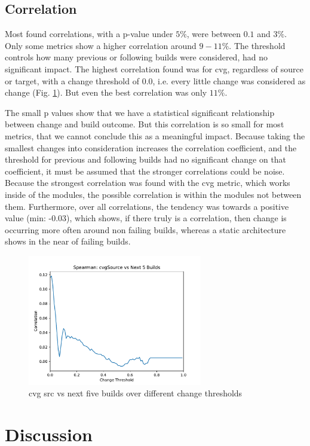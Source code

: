 \documentclass[conference]{IEEEtran}
\begin{document}
\subsection{Correlation}

Most found correlations, with a p-value under $5\%$, were between $0.1$ and $3\%$. Only some metrics show a higher correlation around $9-11\%$. The threshold controls how many previous or following builds were considered, had no significant impact. The highest correlation found was for cvg, regardless of source or target, with a change threshold of $0.0$, i.e. every little change was considered as change (Fig. \ref{cvgPlot}). But even the best correlation was only $11\%$. 

The small p values show that we have a statistical significant relationship between change and build outcome. But this correlation is so small for most metrics, that we cannot conclude this as a meaningful impact. Because taking the smallest changes into consideration increases the correlation coefficient, and the threshold for previous and following builds had no significant change on that coefficient, it must be assumed that the stronger correlations could be noise. Because the strongest correlation was found with the cvg metric, which works inside of the modules, the possible correlation is within the modules not between them. Furthermore, over all correlations, the tendency was towards a positive value (min: -0.03), which shows, if there truly is a correlation, then change is occurring more often around non failing builds, whereas a static architecture shows in the near of failing builds. 

\begin{figure}[!t]
	\centering
	\includegraphics[width=3in]{assets/cvgSourceCorrPlot}
	\caption{cvg src vs next five builds over different change thresholds }
	\label{cvgPlot}
\end{figure}

\section{Discussion}
\end{document}
